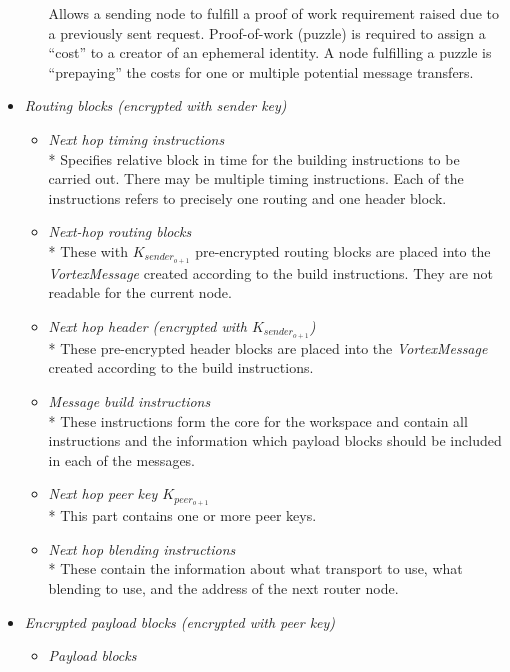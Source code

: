 \documentclass[acmsmall, screen, review]{acmart}
\begin{document}
\begin{itemize}
\begin{itemize}
			Allows a sending node to fulfill a proof of work requirement raised due to a previously sent request. Proof-of-work (puzzle) is required to assign a ``cost'' to a creator of an ephemeral identity. A node fulfilling a puzzle is ``prepaying'' the costs for one or multiple potential message transfers. 
		\end{itemize}
		\item \emph{Routing blocks (encrypted with sender key)}
		\begin{itemize}
			\item \emph{Next hop timing instructions}\\*
			Specifies relative block in time for the building instructions to be carried out. There may be multiple timing instructions. Each of the instructions refers to precisely one routing and one header block.
			\item \emph{Next-hop routing blocks}\\*
			These with $K_{sender_{o+1}}$ pre-encrypted routing blocks are placed into the \emph{VortexMessage} created according to the build instructions. They are not readable for the current node.
			\item \emph{Next hop header (encrypted with $K_{sender_{o+1}}$)}\\*
			These pre-encrypted header blocks are placed into the \emph{VortexMessage} created according to the build instructions.
			\item \emph{Message build instructions}\\*
			These instructions form the core for the workspace and contain all instructions and the information which payload blocks should be included in each of the messages.
			\item \emph{Next hop peer key $K_{peer_{o+1}}$}\\*
			This part contains one or more peer keys.
			\item \emph{Next hop blending instructions}\\*
			These contain the information about what transport to use, what blending to use, and the address of the next router node.
		\end{itemize}
		\item \emph{Encrypted payload blocks (encrypted with peer key)}
		\begin{itemize}
			\item \emph{Payload blocks}
		\end{itemize}
	\end{itemize}
	
\end{document}

